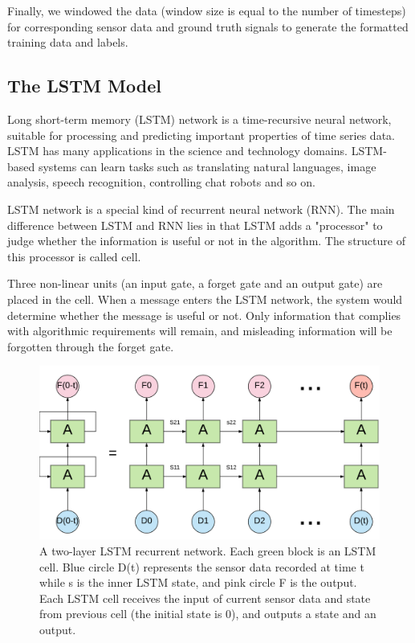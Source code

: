 \documentclass[11pt]{article}
\begin{document}
{Finally, we windowed the data (window size is equal to the number of timesteps) for corresponding sensor data and ground truth signals to generate the formatted training data and labels.


\subsection{The LSTM Model}
Long short-term memory (LSTM) network is a time-recursive neural network, suitable for processing and predicting important properties of time series data. LSTM has many applications in the science and technology domains. LSTM-based systems can learn tasks such as translating natural languages, image analysis, speech recognition, controlling chat robots and so on.

LSTM network is a special kind of recurrent neural network (RNN). The main difference between LSTM and RNN lies in that LSTM adds a "processor" to judge whether the information is useful or not in the algorithm. The structure of this processor is called cell.

Three non-linear units (an input gate, a forget gate and an output gate) are placed in the cell. When a message enters the LSTM network, the system would determine whether the message is useful or not. Only information that complies with algorithmic requirements will remain, and misleading information will be forgotten through the forget gate.


\begin{figure}[ht]
\centering
\includegraphics[scale=0.3]{LSTM3}
\caption{A two-layer LSTM recurrent network. Each green block is an LSTM cell. Blue circle D(t) represents the sensor data recorded at time t while s is the inner LSTM state, and pink circle F is the output. Each LSTM cell receives the input of current sensor data and state from previous cell (the initial state is 0), and outputs a state and an output.}
\label{fig:LSTM}
\end{figure}

}
\end{document}
